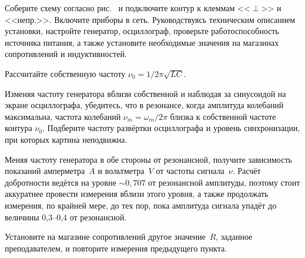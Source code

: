 \begin{lab:task}

    

	\item Соберите схему согласно рис.~
	и подключите контур к клеммам <<$\perp$>> и <<непр.>>. Включите приборы в сеть. 
    Руководствуясь техническим описанием установки, настройте генератор, 
    осциллограф, проверьте работоспособность источника питания, 
    а также установите необходимые значения на магазинах сопротивлений 
    и индуктивностей.


	\item Рассчитайте собственную частоту $\nu_{0} = 1/2\pi\sqrt{LC}$.

	\item Изменяя частоту генератора вблизи собственной и наблюдая за синусоидой 
    на экране осциллографа, убедитесь, что в резонансе, когда амплитуда колебаний 
    максимальна, частота колебаний $\nu_m=\omega_m/2\pi$ близка к собственной 
    частоте контура $\nu_0$. 
    Подберите частоту развёртки осциллографа и уровень синхронизации, 
    при которых картина неподвижна.

	\item Меняя частоту генератора в обе стороны от резонансной, получите 
    зависимость показаний амперметра~$A$ и вольтметра~$V$ от частоты сигнала~$\nu$. 
    Расчёт добротности ведётся на уровне $\sim 0,707$ от резонансной амплитуды, 
    поэтому стоит аккуратнее провести измерения вблизи этого уровня, 
    а также продолжать измерения, по крайней мере, до тех пор, пока амплитуда 
    сигнала упадёт до величины 0,3--0,4 от резонансной.

	\item Установите на магазине сопротивлений другое значение~$R$, заданное
преподавателем, и повторите измерения предыдущего пункта.


\end{lab:task}
